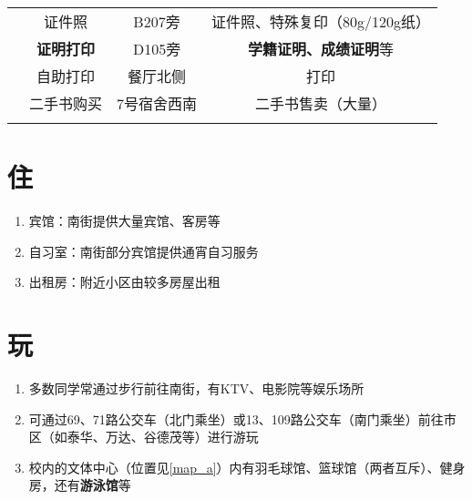 \begin{table}[!ht]
\begin{tabular}{|c|c|c|c|}
        \Xhline{1.2pt}
        \multirow{4}{*}{其他}   & 证件照                & B207旁  & 证件照、特殊复印（80g/120g纸）       \\
        \cline{2-4}
                              & \textbf{证明打印}      & D105旁  & \textbf{学籍证明、成绩证明}等       \\
        \cline{2-4}
                              & 自助打印               & 餐厅北侧   & 打印                        \\
        \cline{2-4}
                              & 二手书购买              & 7号宿舍西南 & 二手书售卖（大量）                 \\
        \Xhline{1.2pt}
    \end{tabular}
\end{table}

\section[住]{住}
\begin{enumerate}
    \item 宾馆：南街提供大量宾馆、客房等
    \item 自习室：南街部分宾馆提供通宵自习服务
    \item 出租房：附近小区由较多房屋出租\footnotemark
\end{enumerate}

\section[玩]{玩}
\begin{enumerate}
    \item 多数同学常通过步行前往南街，有KTV、电影院等娱乐场所
    \item 可通过69、71路公交车（北门乘坐）或13、109路公交车（南门乘坐）前往市区（如泰华、万达、谷德茂等）进行游玩
    \item 校内的文体中心\footnotemark（位置见\ref{map_a}）内有羽毛球馆、篮球馆（两者互斥）、健身房，还有\textbf{游泳馆}等
\end{enumerate}
